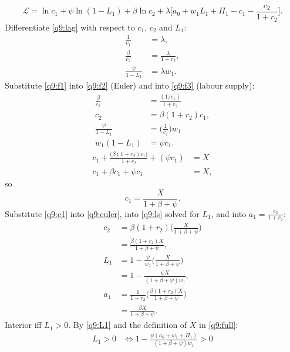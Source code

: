 \begin{sol}
\begin{equation}
\mathcal L=\ln c_1+\psi\ln(1-L_1)+\beta\ln c_2+\lambda\Big[a_0+w_1L_1+\Pi_1-c_1-\frac{c_2}{1+r_2}\Big]. \label{q9:lag}
\end{equation}
Differentiate \eqref{q9:lag} with respect to $c_1$, $c_2$ and $L_1$:
\begin{align}
\frac1{c_1} &= \lambda, \label{q9:f1}\\
\frac\beta{c_2} &= \frac\lambda{1+r_2}, \label{q9:f2}\\
\frac\psi{1-L_1} &= \lambda w_1. \label{q9:f3}
\end{align}
Substitute \eqref{q9:f1} into \eqref{q9:f2} (Euler) and into \eqref{q9:f3} (labour supply):
\begin{align}
\frac\beta{c_2} &= \frac{(1/c_1)}{1+r_2}\nonumber\\
c_2 &= \beta(1+r_2)c_1, \label{q9:euler}\\
\frac\psi{1-L_1} &= \Big(\frac1{c_1}\Big)w_1\nonumber\\
w_1(1-L_1) &= \psi c_1. \label{q9:ls}
\end{align}
\begin{align*}
c_1+\frac{\big(\beta(1+r_2)c_1\big)}{1+r_2}+(\psi c_1) &= X\\
c_1+\beta c_1+\psi c_1 &= X,
\end{align*}
so
\begin{equation}
c_1=\frac{X}{1+\beta+\psi}. \label{q9:c1}
\end{equation}
Substitute \eqref{q9:c1} into \eqref{q9:euler}, into \eqref{q9:ls} solved for $L_1$, and into $a_1=\frac{c_2}{1+r_2}$:
\begin{align}
c_2 &= \beta(1+r_2)\Big(\frac{X}{1+\beta+\psi}\Big)\nonumber\\
&= \frac{\beta(1+r_2)X}{1+\beta+\psi}, \nonumber\\
L_1 &= 1-\frac{\psi}{w_1}\Big(\frac{X}{1+\beta+\psi}\Big)\nonumber\\
&= 1-\frac{\psi X}{(1+\beta+\psi)w_1}, \label{q9:L1}\\
a_1 &= \frac1{1+r_2}\Big(\frac{\beta(1+r_2)X}{1+\beta+\psi}\Big)\nonumber\\
&= \frac{\beta X}{1+\beta+\psi}. \label{q9:a1}
\end{align}
Interior iff $L_1>0$. By \eqref{q9:L1} and the definition of $X$ in \eqref{q9:full}:
\begin{align}
L_1>0 &\iff 1-\frac{\psi(a_0+w_1+\Pi_1)}{(1+\beta+\psi)w_1}>0\nonumber\\

\end{align}
\end{sol}
